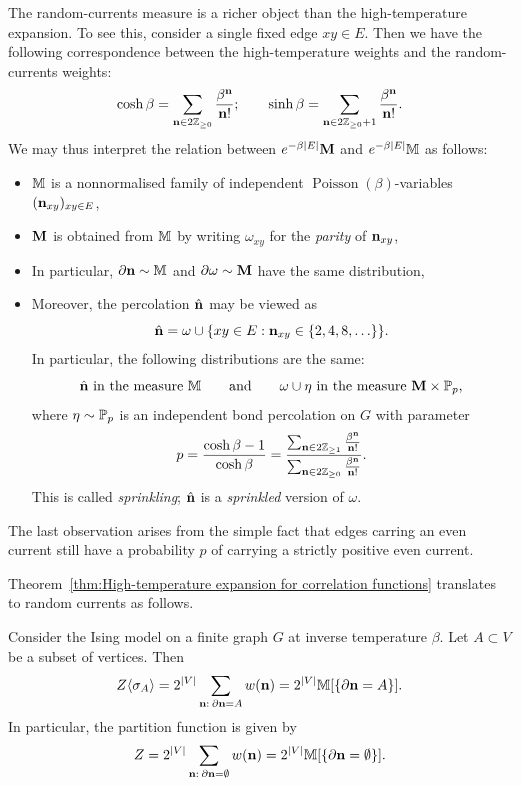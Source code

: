 The random-currents measure is a richer object than the high-temperature expansion.
To see this, consider a single fixed edge $xy\in E$.
Then we have the following correspondence between the high-temperature weights
and the random-currents weights:
\[
    \cosh\beta = \sum_{\n\in 2\Z_{\geq 0}} \frac{\beta^\n}{\n!}
    ;
    \qquad
    \sinh\beta = \sum_{\n\in 2\Z_{\geq 0}+1} \frac{\beta^\n}{\n!}.
\]
We may thus interpret the relation between $e^{-\beta|E|}\bfM$ and $e^{-\beta|E|}\M$ as follows:
\begin{itemize}
    \item $\M$ is a nonnormalised family of independent
        $\operatorname{Poisson}(\beta)$-variables $(\n_{xy})_{xy\in E}$,
    \item $\bfM$ is obtained from $\M$ by writing $\omega_{xy}$ for the \emph{parity} of $\n_{xy}$,
    \item In particular, $\partial\n\sim\M$ and $\partial\omega\sim\bfM$ have the same distribution,
    \item Moreover, the percolation $\hat\n$ may be viewed as
        \[
            \hat\n = \omega \cup\{xy\in E: \n_{xy}\in\{2,4,8,\ldots\}\}.
        \]
        In particular, the following distributions are the same:
        \begin{equation}
            \label{eq:equivalence}
            \text{$\hat\n$ in the measure $\M$}
            \qquad
            \text{and}
            \qquad
            \text{$\omega\cup\eta$ in the measure $\bfM\times\P_{p}$,}
        \end{equation}
        where $\eta\sim\P_p$ is an independent bond percolation on $G$
        with parameter
        \[
            p
            =\frac{\cosh\beta-1}{\cosh\beta}
            =\frac{
                \sum_{\n\in 2\Z_{\geq 1}} \frac{\beta^\n}{\n!}
            }{
                \sum_{\n\in 2\Z_{\geq 0}} \frac{\beta^\n}{\n!}
            }
            .
        \]
        This is called \emph{sprinkling};
        $\hat\n$ is a \emph{sprinkled} version of $\omega$.
\end{itemize}

The last observation arises from the simple fact that edges carring an even current
still have a probability $p$ of carrying a strictly positive even current.

Theorem~\ref{thm:High-temperature expansion for correlation functions}
translates to random currents as follows.

\begin{theorem}
    \label{thm:current_representation_of_correlation_functions}
    Consider the Ising model on a finite graph $G$ at inverse temperature $\beta$.
    Let $A\subset V$ be a subset of vertices.
    Then
    \[
        Z\langle\sigma_A\rangle
        =2^{|V|}\sum_{\n:\:\partial\n=A}
        w(\n)
        =
        2^{|V|}\M[\{\partial\n=A\}].
    \]
    In particular, the partition function is given by
    \[
        Z=2^{|V|}\sum_{\n:\:\partial\n=\emptyset}
        w(\n)
        =
        2^{|V|}\M[\{\partial\n=\emptyset\}].
    \]
\end{theorem}

